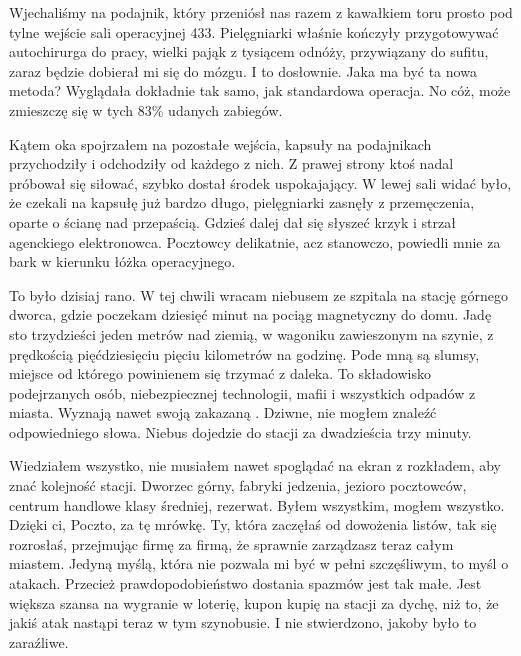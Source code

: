 Wjechaliśmy na podajnik, który przeniósł nas razem z kawałkiem toru prosto pod tylne wejście sali operacyjnej 433.
Pielęgniarki właśnie kończyły przygotowywać autochirurga do pracy, wielki pająk z tysiącem odnóży, przywiązany do sufitu, zaraz będzie dobierał mi się do mózgu. I to dosłownie.
Jaka ma być ta nowa metoda? Wyglądała dokładnie tak samo, jak standardowa operacja. No cóż, może zmieszczę się w tych 83\% udanych zabiegów.

Kątem oka spojrzałem na pozostałe wejścia, kapsuły na podajnikach przychodziły i odchodziły od każdego z nich.
Z prawej strony ktoś nadal próbował się siłować, szybko dostał środek uspokajający.
W lewej sali widać było, że czekali na kapsułę już bardzo długo, pielęgniarki zasnęły z przemęczenia, oparte o ścianę nad przepaścią.
Gdzieś dalej dał się słyszeć krzyk i strzał agenckiego elektronowca.
Pocztowcy delikatnie, acz stanowczo, powiedli mnie za bark w kierunku łóżka operacyjnego.

\divider{}

To było dzisiaj rano. W tej chwili wracam niebusem ze szpitala na stację górnego dworca, gdzie poczekam dziesięć minut na pociąg magnetyczny do domu.
Jadę sto trzydzieści jeden metrów nad ziemią, w wagoniku zawieszonym na szynie, z prędkością pięćdziesięciu pięciu kilometrów na godzinę. 
Pode mną są slumsy, miejsce od którego powinienem się trzymać z daleka. 
To składowisko podejrzanych osób, niebezpiecznej technologii, mafii i wszystkich odpadów z miasta.
Wyznają nawet swoją zakazaną \censor{}.
Dziwne, nie mogłem znaleźć odpowiedniego słowa.
Niebus dojedzie do stacji za dwadzieścia trzy minuty.

Wiedziałem wszystko, nie musiałem nawet spoglądać na ekran z rozkładem, aby znać kolejność stacji.
Dworzec górny, fabryki jedzenia, jezioro pocztowców, centrum handlowe klasy średniej, rezerwat.
Byłem wszystkim, mogłem wszystko. 
Dzięki ci, Poczto, za tę mrówkę. Ty, która zaczęłaś od dowożenia listów, tak się rozrosłaś, przejmując firmę za firmą, że sprawnie zarządzasz teraz całym miastem.
Jedyną myślą, która nie pozwala mi być w pełni szczęśliwym, to myśl o atakach. Przecież prawdopodobieństwo dostania spazmów jest tak małe.
Jest większa szansa na wygranie w loterię, kupon kupię na stacji za dychę, niż to, że jakiś atak nastąpi teraz w tym szynobusie.
I nie stwierdzono, jakoby było to zaraźliwe.


